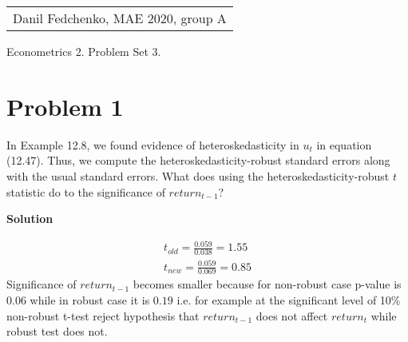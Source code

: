 \documentclass[a4paper]{article}
\begin{document}
	\begin{flushright}
	\begin{tabular}{r}
		Danil Fedchenko, MAE 2020, group A \\
	\end{tabular}
\end{flushright}


\begin{center}
	Econometrics 2. Problem Set 3.
\end{center}
\section*{Problem 1}
In Example 12.8, we found evidence of heteroskedasticity in $u_t$ in equation (12.47). Thus, we compute the heteroskedasticity-robust standard errors along with the usual standard errors. What does using the heteroskedasticity-robust $t$ statistic do to the significance of $return_{t-1}$?

\textbf{Solution}

\begin{align*}
t_{old} = \frac{0.059}{0.038} = 1.55\\
t_{new} = \frac{0.059}{0.069} = 0.85
\end{align*}
Significance of $return_{t-1}$ becomes smaller because for non-robust case p-value is $0.06$ while in robust case it is $0.19$ i.e. for example at the significant level of 10\% non-robust t-test reject hypothesis that $return_{t-1}$ does not affect $return_t$ while robust test does not.
\end{document}
